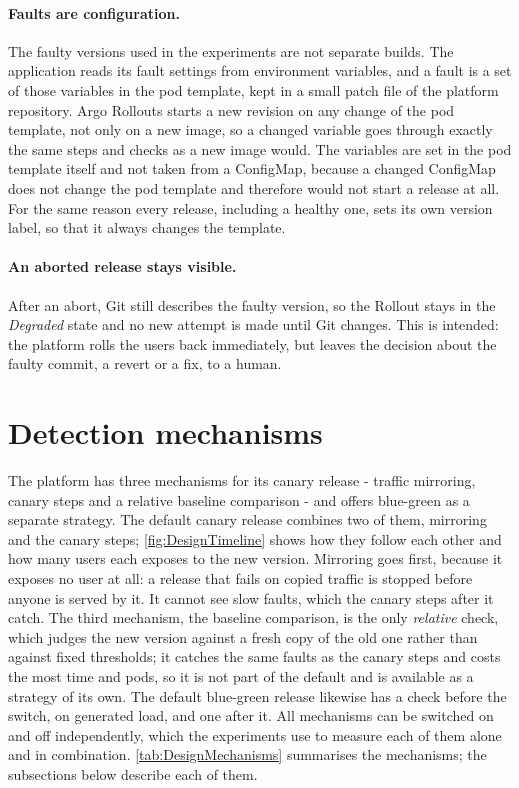 \paragraph{Faults are configuration.} The faulty versions used in the experiments are not separate builds. The application reads its fault settings from environment variables, and a fault is a set of those variables in the pod template, kept in a small patch file of the platform repository. Argo Rollouts starts a new revision on any change of the pod template, not only on a new image, so a changed variable goes through exactly the same steps and checks as a new image would. The variables are set in the pod template itself and not taken from a ConfigMap, because a changed ConfigMap does not change the pod template and therefore would not start a release at all. For the same reason every release, including a healthy one, sets its own version label, so that it always changes the template.

\paragraph{An aborted release stays visible.} After an abort, Git still describes the faulty version, so the Rollout stays in the \emph{Degraded} state and no new attempt is made until Git changes. This is intended: the platform rolls the users back immediately, but leaves the decision about the faulty commit, a revert or a fix, to a human.

\section{Detection mechanisms}
\label{sec:DesignMechanisms}
The platform has three mechanisms for its canary release - traffic mirroring, canary steps and a relative baseline comparison - and offers blue-green as a separate strategy. The default canary release combines two of them, mirroring and the canary steps; \autoref{fig:DesignTimeline} shows how they follow each other and how many users each exposes to the new version. Mirroring goes first, because it exposes no user at all: a release that fails on copied traffic is stopped before anyone is served by it. It cannot see slow faults, which the canary steps after it catch. The third mechanism, the baseline comparison, is the only \emph{relative} check, which judges the new version against a fresh copy of the old one rather than against fixed thresholds; it catches the same faults as the canary steps and costs the most time and pods, so it is not part of the default and is available as a strategy of its own. The default blue-green release likewise has a check before the switch, on generated load, and one after it. All mechanisms can be switched on and off independently, which the experiments use to measure each of them alone and in combination. \autoref{tab:DesignMechanisms} summarises the mechanisms; the subsections below describe each of them.

